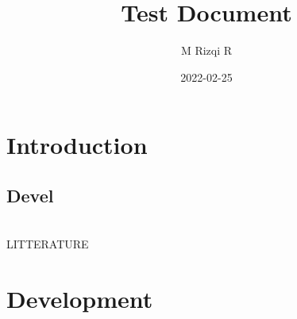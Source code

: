 \documentclass[12pt]{article}
\title{Test Document}
\author{M Rizqi R}
\date{2022-02-25}
\begin{document}
    \maketitle
    \section{Introduction}
    \lipsum[1]
        \subsection{Devel}
        \lipsum[1]\\
        \uppercase{Litterature}
    \section{Development} 
\end{document}
